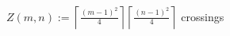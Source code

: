 \documentclass[preview]{standalone}
\begin{document}
\begin{center}
$Z(m,n) := \left\lceil\frac{(m-1)^2}{4}\right\rceil \left\lceil\frac{(n-1)^2}{4}\right\rceil$ crossings
\end{center}
\end{document}
